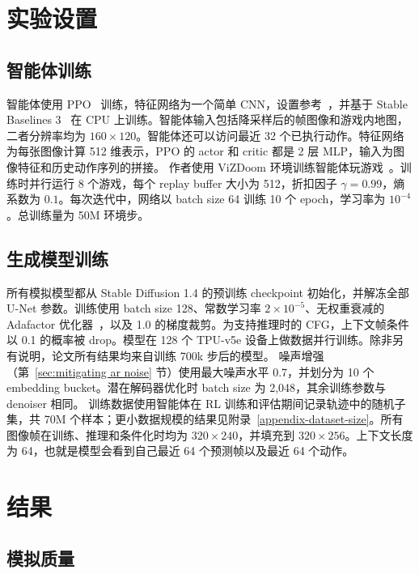 \documentclass{article} %
\begin{document}
\section{实验设置}
\label{experimental_setup}

\subsection{智能体训练}
智能体使用 PPO~\citep{SchulmanWDRK17ppo} 训练，特征网络为一个简单 CNN，设置参考~\cite{Mnih2015HumanlevelCT}，并基于 Stable Baselines 3~\citep{stable-baselines3} 在 CPU 上训练。智能体输入包括降采样后的帧图像和游戏内地图，二者分辨率均为 $160\times120$。智能体还可以访问最近 32 个已执行动作。特征网络为每张图像计算 512 维表示，PPO 的 actor 和 critic 都是 2 层 MLP，输入为图像特征和历史动作序列的拼接。
作者使用 ViZDoom 环境训练智能体玩游戏~\citep{Wydmuch2019ViZdoom}。训练时并行运行 8 个游戏，每个 replay buffer 大小为 512，折扣因子 $\gamma=0.99$，熵系数为 $0.1$。每次迭代中，网络以 batch size 64 训练 10 个 epoch，学习率为 $10^{-4}$。总训练量为 50M 环境步。

\subsection{生成模型训练}
所有模拟模型都从 Stable Diffusion 1.4 的预训练 checkpoint 初始化，并解冻全部 U-Net 参数。训练使用 batch size 128、常数学习率 $2\times10^{-5}$、无权重衰减的 Adafactor 优化器~\citep{Shazeer2018adafactor}，以及 1.0 的梯度裁剪。为支持推理时的 CFG，上下文帧条件以 0.1 的概率被 drop。模型在 128 个 TPU-v5e 设备上做数据并行训练。除非另有说明，论文所有结果均来自训练 700k 步后的模型。
噪声增强（第~\ref{sec:mitigating ar noise} 节）使用最大噪声水平 0.7，并划分为 10 个 embedding bucket。潜在解码器优化时 batch size 为 2,048，其余训练参数与 denoiser 相同。
训练数据使用智能体在 RL 训练和评估期间记录轨迹中的随机子集，共 70M 个样本；更小数据规模的结果见附录~\ref{appendix-dataset-size}。所有图像帧在训练、推理和条件化时均为 $320\times240$，并填充到 $320\times256$。上下文长度为 64，也就是模型会看到自己最近 64 个预测帧以及最近 64 个动作。

\section{结果}
\label{sec:results}

\subsection{模拟质量}
\label{sec:sim quality}
\end{document}
